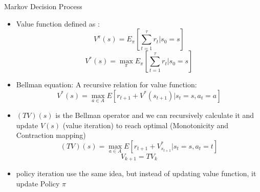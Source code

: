 \begin{frame}{Markov Decision Process}
    \begin{itemize}
        \item Value function defined as :
            \begin{equation}
                V^{\pi}(s)=E_{\pi} [\sum_{t=1}^{\tau} r_{t}|s_{0}=s]
            \end{equation}
            \begin{equation}
                V^*(s)=\max\limits_{\pi} E_{\pi} [\sum_{t=1}^{\tau} r_{t}|s_{0}=s]
            \end{equation}
        \item Bellman equation: A recursive relation for value function:
            \begin{equation}
                V^*(s)=\max\limits_{a\in A} E [r_{t+1}+V^*(s_{t+1})|s_{t}=s,a_{t}=a]
            \end{equation}
        \item $(TV)(s)$ is the Bellman operator and we can recursively calculate it and update $V(s)$ (value iteration) to reach optimal (Monotonicity and Contraction mapping)
            \begin{equation}
                (TV)(s)=\max\limits_{a\in A} E [r_{t+1}+V^*_{s_{t+1}}|s_{t}=s,a_{t}=t]
            \end{equation}
            \begin{equation}
            V_{k+1}=TV_{k}
            \end{equation}
        \item policy iteration use the same idea, but instead of updating value function, it update Policy $\pi$

        
    \end{itemize}
\end{frame}


